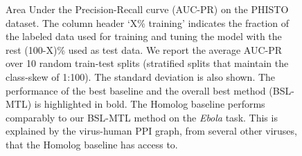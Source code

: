 \documentclass{bioinfo}
\begin{document}
\begin{figure}
\begin{floatrow}
{
\caption{Area Under the Precision-Recall curve (AUC-PR) on the PHISTO dataset. The column header `X\% training' indicates the fraction of the labeled data used for training and tuning the model with the rest (100-X)\% used as test data. We report the average AUC-PR over 10 random train-test splits (stratified splits that maintain the class-skew of 1:100). The standard deviation is also shown. The performance of the best baseline and the overall best method (BSL-MTL) is highlighted in bold. The Homolog baseline performs comparably to our BSL-MTL method on the \textit{Ebola} task. This is explained by the virus-human PPI graph, from several other viruses, that the Homolog baseline has access to.}
\label{resultsTable}
}


\end{floatrow}
\end{figure}
\end{document}
